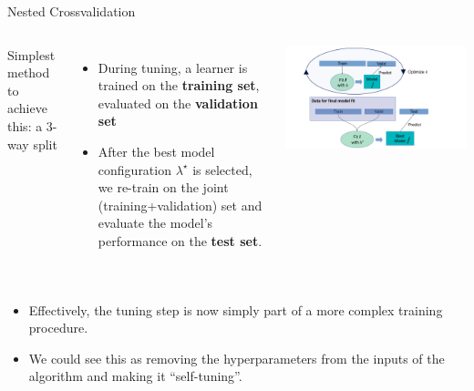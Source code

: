 \begin{frame}{Nested Crossvalidation}
\framebreak

\vspace{1cm}
\begin{columns}[c, onlytextwidth]
\hspace*{-0.3cm}
Simplest method to achieve this: a 3-way split
\begin{itemize}
\item During tuning, a learner is trained on the \textbf{training set},
  evaluated on the  \textbf{validation set}
\item After the best model configuration $\lambda^\star$ is selected, we re-train on the joint (training+validation) set and evaluate the model's performance on the \textbf{test set}.
\end{itemize}

\hspace*{-0.7cm}
\begin{center}
\includegraphics[width=1.2\textwidth]{images/train_valid_test.pdf}
\end{center}
\end{columns}
\framebreak


\vspace{1cm}
\begin{columns}[c, onlytextwidth]
\hspace*{-0.3cm}
\begin{itemize}
\item Effectively, the tuning step is now simply part of a more complex training procedure.
\item We could see this as removing the hyperparameters from the inputs of the algorithm and making it \enquote{self-tuning}.
\end{itemize}


\end{columns}
\end{frame}

